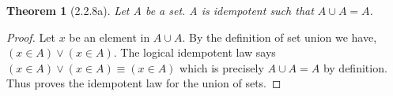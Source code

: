 \documentclass[a4paper, 12pt]{article}
\theoremstyle{plain}
\newtheorem*{theorem*}{Theorem}
\begin{document}
	
	\begin{theorem*}[2.2.8a]
		Let A be a set. A is idempotent such that $A \cup A = A$.
	\end{theorem*}
	
	\begin{proof}
		Let $x$ be an element in $A \cup A$. By the definition of set union we have, \newline $(x \in A) \lor (x \in A)$. The logical idempotent law says \newline $(x \in A) \lor (x \in A) \equiv (x \in A)$ which is precisely $A \cup A = A$ by definition. Thus proves the idempotent law for the union of sets.
	\end{proof}
\end{document}

